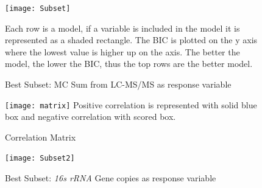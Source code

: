 \clearpage
\newpage


\begin{figure}[!ht]
  \texttt{[image: Subset]}
  \caption{Best Subset: MC Sum from LC-MS/MS as response variable}
  \label{subset}
  Each row is a model, if a variable is included in the model it is represented as a shaded rectangle. The BIC is plotted on the y axis where the lowest value is higher up on the axis. The better the model, the lower the BIC, thus the top rows are the better model.
\end{figure}

\begin{figure}[!ht]
  \caption{Correlation Matrix}
  \texttt{[image: matrix]}
  Positive correlation is represented with solid blue box and negative correlation with scored box.
  \label{matrix}
\end{figure}



\begin{figure}[!ht]
  \texttt{[image: Subset2]}
  \caption{Best Subset: \emph{16s rRNA} Gene copies as response variable}
  \label{subset2}
\end{figure}
